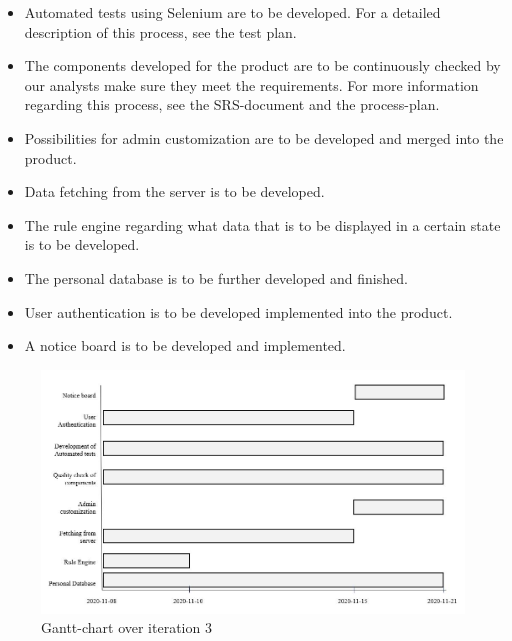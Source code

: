 \begin{itemize}
    \item Automated tests using Selenium are to be developed. For a detailed description of this process, see the test plan.
    \item The components developed for the product are to be continuously checked by our analysts make sure they meet the requirements. For more information regarding this process, see the SRS-document and the process-plan. 
    \item Possibilities for admin customization are to be developed and merged into the product. 
    \item Data fetching from the server is to be developed. 
    \item The rule engine regarding what data that is to be displayed in a certain state is to be developed.
    \item The personal database is to be further developed and finished. 
    \item User authentication is to be developed implemented into the product. 
    \item A notice board is to be developed and implemented.
    
\end{itemize} 

\begin{figure}[H]
\centering
\includegraphics[width=\linewidth]{Pictures/iteration_3.JPG}
\caption{Gantt-chart over iteration 3}
\label{fig:iteration_3}
\end{figure}
 

